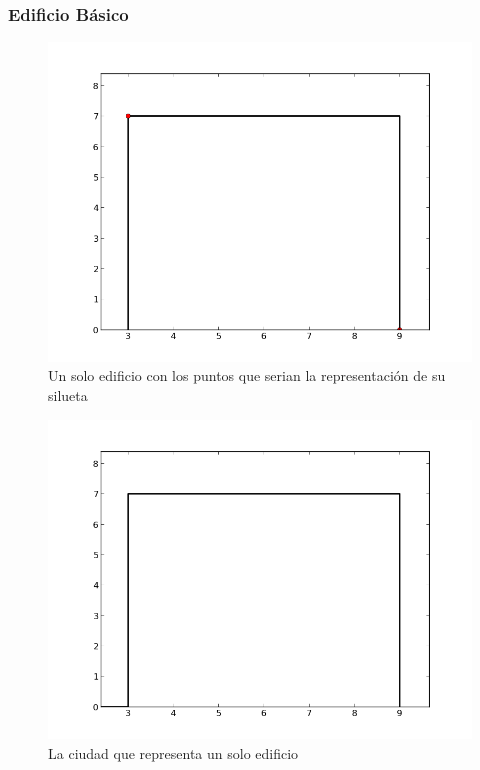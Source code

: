 \subsubsection*{Edificio B\'asico}
\begin{figure}[H]
\begin{center}
\includegraphics[scale=0.5]{./imagenes/ej2_edificio1.png}
\caption{Un solo edificio con los puntos que serian la representaci\'on de su silueta}
\end{center}
\end{figure}
\begin{figure}[H]
\begin{center}
\includegraphics[scale=0.5]{./imagenes/ej2_edificio1solucion.png}
\caption{La ciudad que representa un solo edificio}
\end{center}
\end{figure}


